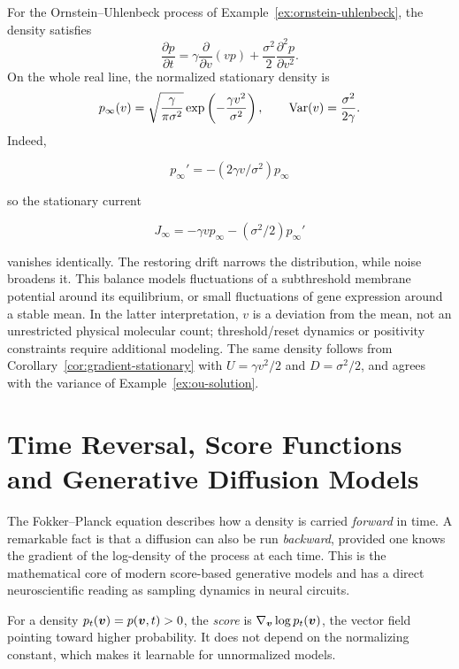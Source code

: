 \begin{example}
\label{ex:noise-genetic}
For the Ornstein--Uhlenbeck process of Example~\ref{ex:ornstein-uhlenbeck}, the density satisfies
\begin{equation}
\frac{\partial p}{\partial t}
=\gamma\frac{\partial}{\partial v}(vp)
+\frac{\sigma^2}{2}\frac{\partial^2p}{\partial v^2}.
\end{equation}
On the whole real line, the normalized stationary density is
\begin{equation}
p_\infty(v)=\sqrt{\frac{\gamma}{\pi\sigma^2}}
\exp\left(-\frac{\gamma v^2}{\sigma^2}\right),
\qquad \operatorname{Var}(v)=\frac{\sigma^2}{2\gamma}.
\end{equation}
Indeed, 

\[
p_\infty'=-(2\gamma v/\sigma^2)p_\infty
\] 

so the stationary current 

\[
J_\infty=-\gamma v p_\infty-(\sigma^2/2)p_\infty'
\] 

vanishes identically. The restoring drift narrows the distribution, while noise broadens it. This balance models fluctuations of a subthreshold membrane potential around its equilibrium, or small fluctuations of gene expression around a stable mean. In the latter interpretation, $v$ is a deviation from the mean, not an unrestricted physical molecular count; threshold/reset dynamics or positivity constraints require additional modeling. The same density follows from Corollary~\ref{cor:gradient-stationary} with $U=\gamma v^2/2$ and $D=\sigma^2/2$, and agrees with the variance of Example~\ref{ex:ou-solution}.
\end{example}

\section{Time Reversal, Score Functions and Generative Diffusion Models}
\label{sec:reverse-time}

The Fokker--Planck equation describes how a density is carried \emph{forward} in time. A remarkable fact is that a diffusion can also be run \emph{backward}, provided one knows the gradient of the log-density of the process at each time. This is the mathematical core of modern score-based generative models and has a direct neuroscientific reading as sampling dynamics in neural circuits.

\begin{definition}
\label{def:score}
For a density $p_t(\bm{v})=p(\bm{v},t)>0$, the \emph{score} is $\nabla_{\bm{v}}\log p_t(\bm{v})$, the vector field pointing toward higher probability. It does not depend on the normalizing constant, which makes it learnable for unnormalized models.
\end{definition}

